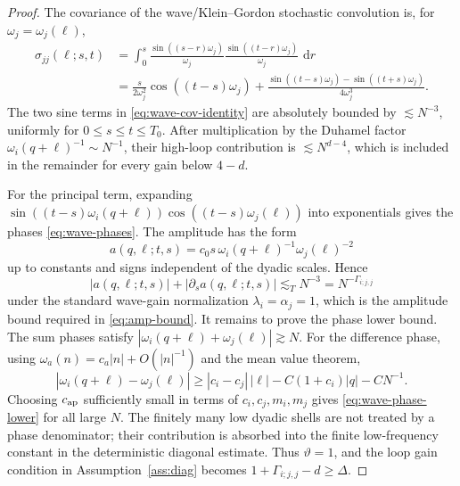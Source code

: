 \documentclass[11pt,reqno]{amsart}
\numberwithin{equation}{section}
\theoremstyle{plain}
\theoremstyle{definition}
\newcommand{\dd}{\,\mathrm d}
\begin{document}
\begin{proof}
The covariance of the wave/Klein--Gordon stochastic convolution is, for \(\omega_j=\omega_j(\ell)\),
\begin{equation}\label{eq:wave-cov-identity}
\begin{aligned}
        \sigma_{jj}(\ell;s,t)
        &=\int_0^s\frac{\sin((s-r)\omega_j)}{\omega_j}
        \frac{\sin((t-r)\omega_j)}{\omega_j}\, \dd r  \\
        &=\frac{s}{2\omega_j^2}\cos((t-s)\omega_j)
        +\frac{\sin((t-s)\omega_j)-\sin((t+s)\omega_j)}{4\omega_j^3}.
\end{aligned}
\end{equation}
The two sine terms in \eqref{eq:wave-cov-identity} are absolutely bounded by \(\lesssim N^{-3}\), uniformly for \(0\le s\le t\le T_0\).  After multiplication by the Duhamel factor \(\omega_i(q+\ell)^{-1}\sim N^{-1}\), their high-loop contribution is \(\lesssim N^{d-4}\), which is included in the remainder for every gain below \(4-d\).

For the principal term, expanding \(\sin((t-s)\omega_i(q+\ell))\cos((t-s)\omega_j(\ell))\) into exponentials gives the phases \eqref{eq:wave-phases}.  The amplitude has the form
\[
        a(q,\ell;t,s)=c_0 s\,\omega_i(q+\ell)^{-1}\omega_j(\ell)^{-2}
\]
up to constants and signs independent of the dyadic scales.  Hence
\[
        |a(q,\ell;t,s)|+|\partial_s a(q,\ell;t,s)|
        \lesssim_T N^{-3}=N^{-\Gamma_{i;j,j}}
\]
under the standard wave-gain normalization \(\lambda_i=\alpha_j=1\), which is the amplitude bound required in \eqref{eq:amp-bound}.  It remains to prove the phase lower bound.  The sum phases satisfy \(|\omega_i(q+\ell)+\omega_j(\ell)|\gtrsim N\).  For the difference phase, using \(\omega_a(n)=c_a|n|+O(|n|^{-1})\) and the mean value theorem,
\[
        |\omega_i(q+\ell)-\omega_j(\ell)|
        \ge |c_i-c_j|\,|\ell|-C(1+c_i)|q|-CN^{-1}.
\]
Choosing \(c_{\rm ap}\) sufficiently small in terms of \(c_i,c_j,m_i,m_j\) gives \eqref{eq:wave-phase-lower} for all large \(N\).  The finitely many low dyadic shells are not treated by a phase denominator; their contribution is absorbed into the finite low-frequency constant in the deterministic diagonal estimate.  Thus \(\vartheta=1\), and the loop gain condition in Assumption~\ref{ass:diag} becomes \(1+\Gamma_{i;j,j}-d\ge\Delta\).
\end{proof}
\end{document}
